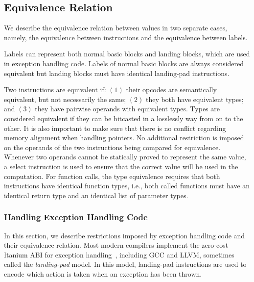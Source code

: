 \subsection{Equivalence Relation}

We describe the equivalence relation between values in two
separate cases, namely, the equivalence between instructions and the
equivalence between labels.

Labels can represent both normal basic blocks and landing blocks, which are used
in exception handling code.
Labels of normal basic blocks are always considered equivalent but
landing blocks must have identical landing-pad instructions.

Two instructions are equivalent if: $(1)$ their opcodes are semantically
equivalent, but not necessarily the same; $(2)$ they both have equivalent types;
and $(3)$ they have pairwise operands with equivalent types.
Types are considered equivalent if they can be bitcasted in a losslessly way
from on to the other.
It is also important to make sure that there is no conflict regarding memory
alignment when handling pointers.
No additional restriction is imposed on the operands of the two instructions
being compared for equivalence.
Whenever two operands cannot be statically proved to represent the same value,
a select instruction is used to ensure that the correct value will be used in
the computation.
For function calls, the type equivalence requires that both instructions have
identical function types, i.e., both called functions must have an identical
return type and an identical list of parameter types. 

\subsubsection{Handling Exception Handling Code}

In this section, we describe restrictions imposed by exception handling code and
their equivalence relation.
Most modern compilers implement the zero-cost Itanium ABI for exception
handling~\cite{dinechin00}, including GCC and LLVM, sometimes called the
\textit{landing-pad} model.
In this model, landing-pad instructions are used to encode which action is taken
when an exception has been thrown.

